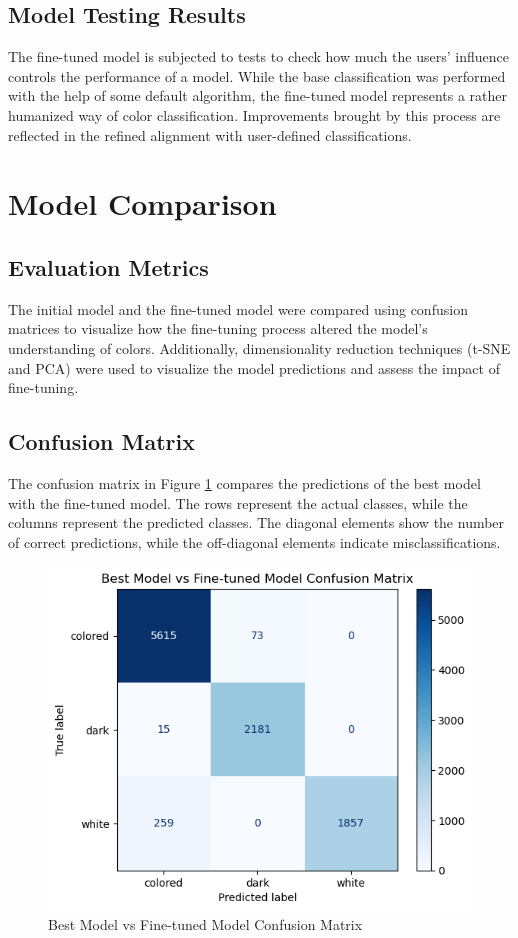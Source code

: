 \documentclass{article}
\begin{document}
\subsection{Model Testing Results}
The fine-tuned model is subjected to tests to check how much the users' influence controls the performance of a model. While the base classification was performed with the help of some default algorithm, the fine-tuned model represents a rather humanized way of color classification. Improvements brought by this process are reflected in the refined alignment with user-defined classifications.
\newpage

\section{Model Comparison}
\subsection{Evaluation Metrics}
The initial model and the fine-tuned model were compared using confusion matrices to visualize how the fine-tuning process altered the model's understanding of colors. Additionally, dimensionality reduction techniques (t-SNE and PCA) were used to visualize the model predictions and assess the impact of fine-tuning.

\subsection{Confusion Matrix}
The confusion matrix in Figure \ref{fig:confusion_matrix} compares the predictions of the best model with the fine-tuned model. The rows represent the actual classes, while the columns represent the predicted classes. The diagonal elements show the number of correct predictions, while the off-diagonal elements indicate misclassifications.

\begin{figure}[H]
    \centering
    \includegraphics[width=\textwidth]{pictures/graph_1_comp.png}
    \caption{Best Model vs Fine-tuned Model Confusion Matrix}
    \label{fig:confusion_matrix}
\end{figure}
\end{document}
